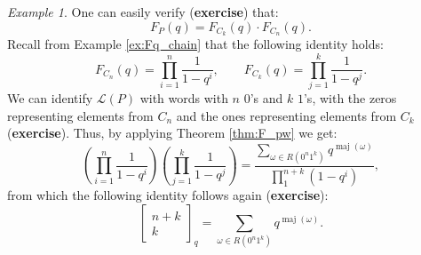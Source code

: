 \documentclass[11pt]{amsart}
\theoremstyle{plain}
\theoremstyle{definition}
\theoremstyle{remark}
\newtheorem{example}{Example}[section]
\newcommand{\LL}{\mathcal{L}}
\DeclareMathOperator{\maj}{maj}
\newcommand{\binomsq}[2]{\left[\begin{matrix} #1 \\ #2 \end{matrix}\right]}
\numberwithin{equation}{section}
\begin{document}
\begin{example}
	One can easily verify (\textbf{exercise}) that:
	\[
		F_P(q) = F_{C_k}(q) \cdot F_{C_n}(q).
	\]
	Recall from Example \ref{ex:Fq_chain} that the following identity holds:
	\[
		F_{C_n}(q) = \prod_{i=1}^n \frac{1}{1-q^i}, \qquad F_{C_k}(q) = \prod_{j=1}^k \frac{1}{1-q^j}.
	\]
	We can identify $\LL(P)$ with words with $n$ $0$'s and $k$ $1$'s, with the zeros representing elements from $C_n$ and the
	ones representing elements from $C_k$ (\textbf{exercise}). Thus, by applying Theorem \ref{thm:F_pw} we get:
	\[
		\left( \prod_{i=1}^n \frac{1}{1-q^i} \right) \left( \prod_{j=1}^k \frac{1}{1-q^j} \right) = \frac{\sum_{\omega \in R(0^n1^k)} q^{\maj(\omega)}}{\prod_1^{n+k} (1-q^i)},
	\]
	from which the following identity follows again (\textbf{exercise}):
	\[
		\binomsq{n+k}{k}_q = \sum_{\omega \in R(0^n1^k)} q^{\maj(\omega)}.
	\]
\end{example}
\end{document}
